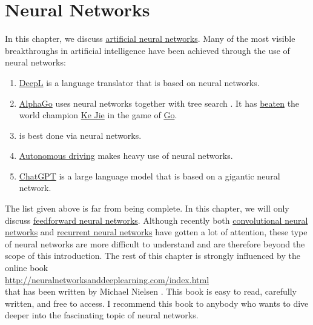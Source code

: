 \chapter{Neural Networks}
In this chapter, we discuss \href{https://en.wikipedia.org/wiki/Artificial_neural_network}{artificial neural networks}.
Many of the most visible breakthroughs in artificial intelligence have been achieved through the use of neural
networks: 
\begin{enumerate}
\item \href{https://www.deepl.com/translator}{DeepL} is a language translator that is based on neural networks.      
\item \href{https://en.wikipedia.org/wiki/AlphaGo}{AlphaGo} uses neural networks together with tree search
      \cite{silver:2016}.  It has \href{https://en.wikipedia.org/wiki/AlphaGo_versus_Ke_Jie}{beaten} 
      the world champion \href{https://en.wikipedia.org/wiki/Ke_Jie}{Ke Jie} in the game of
      \href{https://en.wikipedia.org/wiki/Go_(game)}{Go}.
\item {} is best done via neural networks.
\item \href{https://en.wikipedia.org/wiki/Autonomous_car}{Autonomous driving} makes heavy use of neural networks.
\item \href{https://chat.openai.com/}{ChatGPT} is a large language model that is based on a gigantic neural network.
\end{enumerate}
The list given above is far from being complete.  In this chapter, we will only discuss 
\href{https://en.wikipedia.org/wiki/Feedforward_neural_network}{feedforward neural networks}.  Although recently both 
\href{https://en.wikipedia.org/wiki/Convolutional_neural_network}{convolutional neural networks} and
\href{https://en.wikipedia.org/wiki/Recurrent_neural_network}{recurrent neural networks} have gotten a lot of
attention, these type of neural networks are more difficult to understand and are therefore beyond the scope of this
introduction.  The rest of this chapter is strongly influenced by the online book 
\\[0.2cm]
\hspace*{1.3cm}
\href{http://neuralnetworksanddeeplearning.com/index.html}{http://neuralnetworksanddeeplearning.com/index.html}
\\[0.2cm]
that has been written by Michael Nielsen \cite{nielsen:2015}.  This book is easy to read, carefully written, and
free to access.  I recommend this book to anybody who wants to dive deeper into the fascinating topic of neural
networks.

